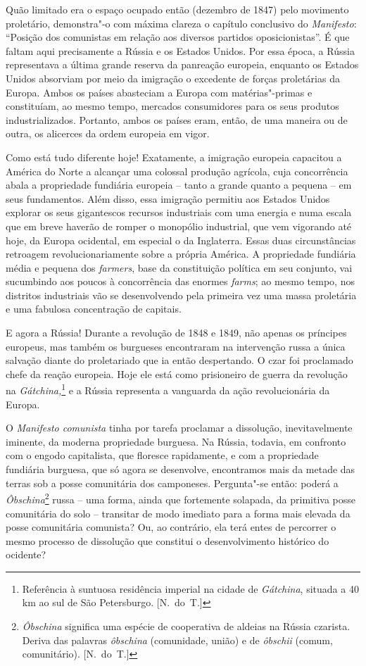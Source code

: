 \begin{hedraquote}
Quão limitado era o espaço ocupado então (dezembro de 1847) pelo
movimento proletário, demonstra"-o com máxima clareza o capítulo
conclusivo do \textit{Manifesto}: “Posição dos comunistas em relação
aos diversos partidos oposicionistas”. É que faltam aqui precisamente a
Rússia e os Estados Unidos. Por essa época, a Rússia
representava a última grande reserva da panreação europeia, enquanto
os Estados Unidos absorviam por meio da imigração o excedente de forças
proletárias da Europa. Ambos os países abasteciam a Europa com
matérias"-primas e constituíam, ao mesmo tempo, mercados consumidores
para os seus produtos industrializados. Portanto, ambos os países eram,
então, de uma maneira ou de outra, os alicerces da ordem europeia em
vigor.

Como está tudo diferente hoje! Exatamente, a imigração europeia capacitou
a América do Norte a alcançar uma colossal produção agrícola, cuja
concorrência abala a propriedade fundiária europeia – tanto a grande
quanto a pequena – em seus fundamentos. Além disso, essa imigração
permitiu aos Estados Unidos explorar os seus gigantescos recursos
industriais com uma energia e numa escala que em breve haverão de
romper o monopólio industrial, que vem vigorando até hoje, da Europa
ocidental, em especial o da Inglaterra. Essas duas circunstâncias
retroagem revolucionariamente sobre a própria América. A propriedade
fundiária média e pequena dos \textit{farmers}, base da constituição
política em seu conjunto, vai sucumbindo aos poucos à concorrência das
enormes \textit{farms}; ao mesmo tempo, nos distritos industriais vão
se desenvolvendo pela primeira vez uma massa proletária e uma fabulosa
concentração de capitais. 

E agora a Rússia! Durante a revolução de 1848 e 1849, não apenas os
príncipes europeus, mas também os burgueses encontraram na intervenção
russa a única salvação diante do proletariado que ia então despertando.
O czar foi proclamado chefe da reação europeia. Hoje ele está como
prisioneiro de guerra da revolução na \textit{Gátchina,}\footnote{
Referência à suntuosa residência imperial na cidade de
\textit{Gátchina}, situada a 40 km ao sul de São Petersburgo. [N.~do~T.]}   e a Rússia representa a vanguarda da ação revolucionária da
Europa.

 O \textit{Manifesto comunista} tinha por tarefa proclamar a dissolução,
inevitavelmente iminente, da moderna propriedade burguesa. Na Rússia,
todavia, em confronto com o engodo capitalista, que floresce rapidamente,
e com a propriedade fundiária burguesa, que só agora se desenvolve,
encontramos mais da metade das terras sob a posse comunitária dos
camponeses. Pergunta"-se então: poderá a
\textit{Ôbschina}\footnote{ \textit{Ôbschina} significa uma
espécie de cooperativa de aldeias na Rússia czarista. Deriva das
palavras \textit{ôbschina} (comunidade, união) e de \textit{ôbschii} (comum, comunitário). [N.~do~T.]} russa
– uma forma, ainda que fortemente solapada, da primitiva posse
comunitária do solo – transitar de modo imediato para a forma mais
elevada da posse comunitária comunista? Ou, ao contrário, ela terá
entes de percorrer o mesmo processo de dissolução que constitui o
desenvolvimento histórico do ocidente?


\end{hedraquote}
